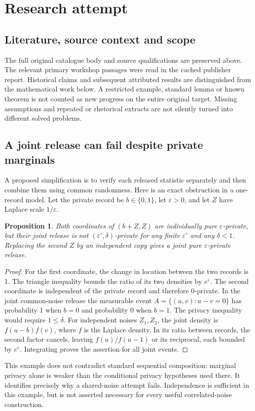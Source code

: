 \documentclass[11pt]{article}
\newtheorem{proposition}{Proposition}
\begin{document}
\section{Research attempt}
\subsection{Literature, source context and scope}
The full original catalogue body and source qualifications are preserved above. The relevant primary workshop passages were read in the cached publisher report. Historical claims and subsequent attributed results are distinguished from the mathematical work below. A restricted example, standard lemma or known theorem is not counted as new progress on the entire original target. Missing assumptions and repeated or rhetorical extracts are not silently turned into different solved problems.

\subsection{A joint release can fail despite private marginals}
A proposed simplification is to verify each released statistic separately and then combine them using common randomness. Here is an exact obstruction in a one-record model. Let the private record be $b\in\{0,1\}$, let $\varepsilon>0$, and let $Z$ have Laplace scale $1/\varepsilon$.
\begin{proposition}
Both coordinates of $(b+Z,Z)$ are individually pure $\varepsilon$-private, but their joint release is not $(\varepsilon',\delta)$-private for any finite $\varepsilon'$ and any $\delta<1$. Replacing the second $Z$ by an independent copy gives a joint pure $\varepsilon$-private release.
\end{proposition}
\begin{proof}
For the first coordinate, the change in location between the two records is 1. The triangle inequality bounds the ratio of its two densities by $e^\varepsilon$. The second coordinate is independent of the private record and therefore 0-private. In the joint common-noise release the measurable event $A=\{(u,v):u-v=0\}$ has probability 1 when $b=0$ and probability 0 when $b=1$. The privacy inequality would require $1\le\delta$.
For independent noises $Z_1,Z_2$, the joint density is $f(u-b)f(v)$, where $f$ is the Laplace density. In its ratio between records, the second factor cancels, leaving $f(u)/f(u-1)$ or its reciprocal, each bounded by $e^\varepsilon$. Integrating proves the assertion for all joint events.
\end{proof}
This example does not contradict standard sequential composition: marginal privacy alone is weaker than the conditional privacy hypotheses used there. It identifies precisely why a shared-noise attempt fails. Independence is sufficient in this example, but is not asserted necessary for every useful correlated-noise construction.
\end{document}
